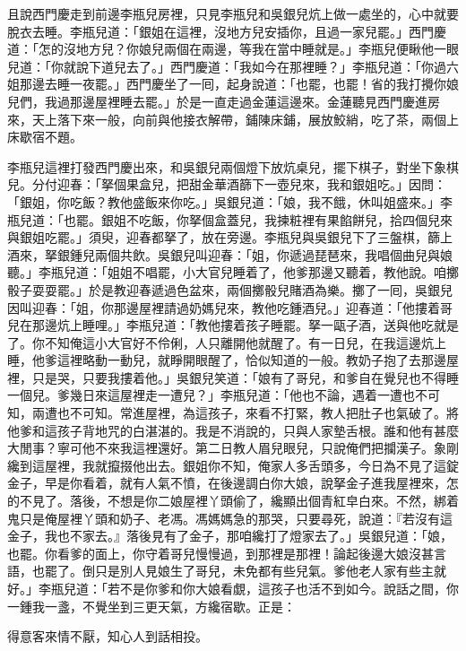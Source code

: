 且說西門慶走到前邊李瓶兒房裡，只見李瓶兒和吳銀兒炕上做一處坐的，心中就要脫衣去睡。李瓶兒道：「銀姐在這裡，沒地方兒安插你，且過一家兒罷。」西門慶道：「怎的沒地方兒？你娘兒兩個在兩邊，等我在當中睡就是。」李瓶兒便瞅他一眼兒道：「你就說下道兒去了。」西門慶道：「我如今在那裡睡？」李瓶兒道：「你過六姐那邊去睡一夜罷。」西門慶坐了一囘，起身說道：「也罷，也罷！省的我打攪你娘兒們，我過那邊屋裡睡去罷。」於是一直走過金蓮這邊來。金蓮聽見西門慶進房來，天上落下來一般，向前與他接衣解帶，鋪陳床鋪，展放鮫綃，吃了茶，兩個上床歇宿不題。

李瓶兒這裡打發西門慶出來，和吳銀兒兩個燈下放炕桌兒，擺下棋子，對坐下象棋兒。分付迎春：「拏個果盒兒，把甜金華酒篩下一壺兒來，我和銀姐吃。」因問：「銀姐，你吃飯？教他盛飯來你吃。」吳銀兒道：「娘，我不餓，休叫姐盛來。」李瓶兒道：「也罷。銀姐不吃飯，你拏個盒蓋兒，我揀粧裡有果餡餅兒，拾四個兒來與銀姐吃罷。」須臾，迎春都拏了，放在旁邊。李瓶兒與吳銀兒下了三盤棋，篩上酒來，拏銀鍾兒兩個共飲。吳銀兒叫迎春：「姐，你遞過琵琶來，我唱個曲兒與娘聽。」李瓶兒道：「姐姐不唱罷，小大官兒睡着了，他爹那邊又聽着，教他說。咱擲骰子耍耍罷。」於是教迎春遞過色盆來，兩個擲骰兒賭酒為樂。擲了一囘，吳銀兒因叫迎春：「姐，你那邊屋裡請過奶媽兒來，教他吃鍾酒兒。」迎春道：「他摟着哥兒在那邊炕上睡哩。」李瓶兒道：「教他摟着孩子睡罷。拏一甌子酒，送與他吃就是了。你不知俺這小大官好不伶俐，人只離開他就醒了。有一日兒，在我這邊炕上睡，他爹這裡略動一動兒，就睜開眼醒了，恰似知道的一般。教奶子抱了去那邊屋裡，只是哭，只要我摟着他。」吳銀兒笑道：「娘有了哥兒，和爹自在覺兒也不得睡一個兒。爹幾日來這屋裡走一遭兒？」李瓶兒道：「他也不論，遇着一遭也不可知，兩遭也不可知。常進屋裡，為這孩子，來看不打緊，教人把肚子也氣破了。將他爹和這孩子背地咒的白湛湛的。我是不消說的，只與人家墊舌根。誰和他有甚麼大閒事？寧可他不來我這裡還好。第二日教人眉兒眼兒，只說俺們把攔漢子。象剛纔到這屋裡，我就攛掇他出去。銀姐你不知，俺家人多舌頭多，今日為不見了這錠金子，早是你看着，就有人氣不憤，在後邊調白你大娘，說拏金子進我屋裡來，怎的不見了。落後，不想是你二娘屋裡丫頭偷了，纔顯出個青紅皁白來。不然，綁着鬼只是俺屋裡丫頭和奶子、老馮。馮媽媽急的那哭，只要尋死，說道：『若沒有這金子，我也不家去。』落後見有了金子，那咱纔打了燈家去了。」吳銀兒道：「娘，也罷。你看爹的面上，你守着哥兒慢慢過，到那裡是那裡！論起後邊大娘沒甚言語，也罷了。倒只是別人見娘生了哥兒，未免都有些兒氣。爹他老人家有些主就好。」李瓶兒道：「若不是你爹和你大娘看覷，這孩子也活不到如今。說話之間，你一鍾我一盞，不覺坐到三更天氣，方纔宿歇。正是：

得意客來情不厭，知心人到話相投。


